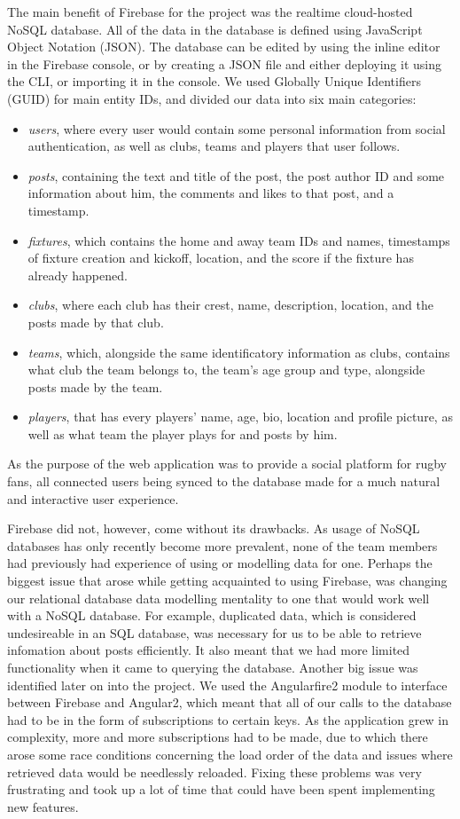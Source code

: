 \documentclass{l3proj}
\begin{document}
The main benefit of Firebase for the project was the realtime cloud-hosted NoSQL database.
All of the data in the database is defined using JavaScript Object Notation (JSON).
The database can be edited by using the inline editor in the Firebase console, or by creating a JSON file and either deploying it using the CLI, or importing it in the console.
We used Globally Unique Identifiers (GUID) for main entity IDs, and divided our data into six main categories:
\begin{itemize}
\item \textit{users}, where every user would contain some personal information from social authentication, as well as clubs, teams and players that user follows.
\item \textit{posts}, containing the text and title of the post, the post author ID and some information about him, the comments and likes to that post, and a timestamp.
\item \textit{fixtures}, which contains the home and away team IDs and names, timestamps of fixture creation and kickoff, location, and the score if the fixture has already happened.
\item \textit{clubs}, where each club has their crest, name, description, location, and the posts made by that club.
\item \textit{teams}, which, alongside the same identificatory information as clubs, contains what club the team belongs to, the team's age group and type, alongside posts made by the team.
\item \textit{players}, that has every players' name, age, bio, location and profile picture, as well as what team the player plays for and posts by him.
\end{itemize}
As the purpose of the web application was to provide a social platform for rugby fans, all connected users being synced to the database made for a much natural and interactive user experience.



Firebase did not, however, come without its drawbacks. As usage of NoSQL databases has only recently become more prevalent, none of the team members had previously had experience of using or modelling data for one.
Perhaps the biggest issue that arose while getting acquainted to using Firebase, was changing our relational database data modelling mentality to one that would work well with a NoSQL database. For example, duplicated data, which is considered undesireable in an SQL database, was necessary for us to be able to retrieve infomation about posts efficiently. It also meant that we had more limited functionality when it came to querying the database.
Another big issue was identified later on into the project. We used the Angularfire2 module to interface between Firebase and Angular2, which meant that all of our calls to the database had to be in the form of subscriptions to certain keys.
As the application grew in complexity, more and more subscriptions had to be made, due to which there arose some race conditions concerning the load order of the data and issues where retrieved data would be needlessly reloaded. Fixing these problems was very frustrating and took up a lot of time that could have been spent implementing new features.
\end{document}
